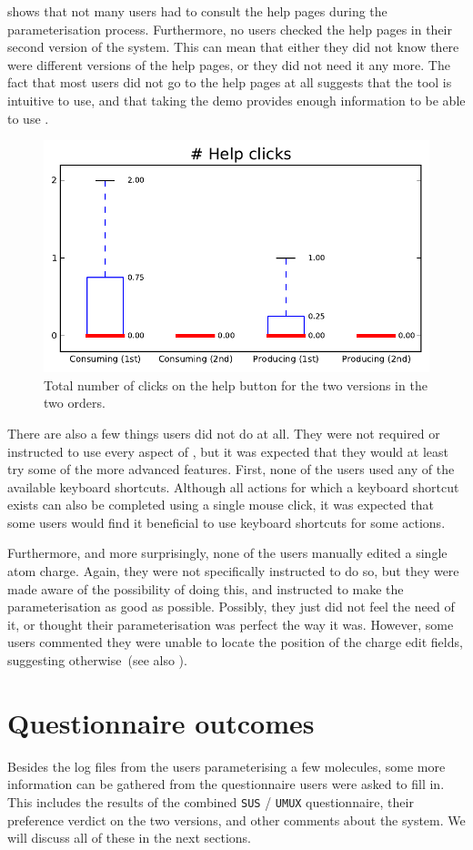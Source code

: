  shows that not many users had to consult the help pages during the parameterisation process. Furthermore, no users checked the help pages in their second version of the system. This can mean that either they did not know there were different versions of the help pages, or they did not need it any more. The fact that most users did not go to the help pages at all suggests that the tool is intuitive to use, and that taking the demo provides enough information to be able to use \oframp.

\begin{figure}
\center
\includegraphics[width=.6\textwidth]{img/graphs/1b_01.pdf}
\caption{Total number of clicks on the help button for the two versions in the two orders.}
\end{figure}

There are also a few things users did not do at all. They were not required or instructed to use every aspect of \oframp, but it was expected that they would at least try some of the more advanced features. First, none of the users used any of the available keyboard shortcuts. Although all actions for which a keyboard shortcut exists can also be completed using a single mouse click, it was expected that some users would find it beneficial to use keyboard shortcuts for some actions.

Furthermore, and more surprisingly, none of the users manually edited a single atom charge. Again, they were not specifically instructed to do so, but they were made aware of the possibility of doing this, and instructed to make the parameterisation as good as possible. Possibly, they just did not feel the need of it, or thought their parameterisation was perfect the way it was. However, some users commented they were unable to locate the position of the charge edit fields, suggesting otherwise~(see also ).



\section{Questionnaire outcomes}
Besides the log files from the users parameterising a few molecules, some more information can be gathered from the questionnaire users were asked to fill in. This includes the results of the combined \verb|SUS| / \verb|UMUX| questionnaire, their preference verdict on the two versions, and other comments about the system. We will discuss all of these in the next sections.

